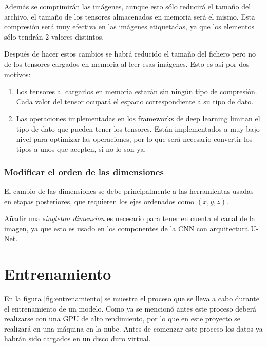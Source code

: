 Además se comprimirán las imágenes, aunque esto sólo reducirá el tamaño del archivo, el tamaño de los tensores almacenados en memoria será el mismo. Esta compresión será muy efectiva en las imágenes etiquetadas, ya que los elementos sólo tendrán 2 valores distintos. 

Después de hacer estos cambios se habrá reducido el tamaño del fichero pero no de los tensores cargados en memoria al leer esas imágenes. Esto es así por dos motivos:
\begin{enumerate}
\item Los tensores al cargarlos en memoria estarán sin ningún tipo de compresión. Cada valor del tensor ocupará el espacio correspondiente a su tipo de dato.
\item Las operaciones implementadas en los frameworks de deep learning limitan el tipo de dato que pueden tener los tensores. Están implementados a muy bajo nivel para optimizar las operaciones, por lo que será necesario  convertir los tipos a unos que acepten, si no lo son ya.
\end{enumerate}

\subsubsection{Modificar el orden de las dimensiones}

El cambio de las dimensiones se debe principalmente a las herramientas usadas en etapas posteriores, que requieren los ejes ordenados como $(x,y,z)$.

Añadir una \textit{singleton dimension} es necesario para tener en cuenta el canal de la imagen, ya que esto es usado en los componentes de la CNN con arquitectura U-Net.

\pagebreak \section{Entrenamiento}\label{sec:entrenamiento}


En la figura \ref{fig:entrenamiento} se muestra el proceso que se lleva a cabo durante el entrenamiento de un modelo. Como ya se mencionó antes este proceso deberá realizarse con una GPU de alto rendimiento, por lo que en este proyecto se realizará en una máquina en la nube. Antes de comenzar este proceso los datos ya habrán sido cargados en un disco duro virtual.


